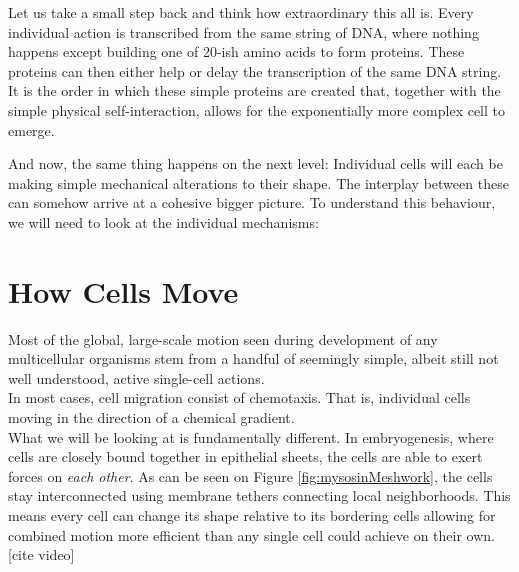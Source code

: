 Let us take a small step back and think how extraordinary this all is. Every individual action is transcribed from the same string of DNA, where nothing happens except building one of 20-ish amino acids to form proteins. These proteins can then either help or delay the transcription of the same DNA string. It is the order in which these simple proteins are created that, together with the simple physical self-interaction, allows for the exponentially more complex cell to emerge.


And now, the same thing happens on the next level: Individual cells will each be making simple mechanical alterations to their shape. The interplay between these can somehow arrive at a cohesive bigger picture. To understand this behaviour, we will need to look at the individual mechanisms:

\section{How Cells Move}
\label{sec:howmove}
Most of the global, large-scale motion seen during development of any multicellular organisms stem from a handful of seemingly simple, albeit still not well understood, active single-cell actions.\cite{walck2014cell}\\

In most cases, cell migration consist of chemotaxis. That is, individual cells moving in the direction of a chemical gradient.\\
What we will be looking at is fundamentally different. In embryogenesis, where cells are closely bound together in epithelial sheets, the cells are able to exert forces on \textit{each other}. As can be seen on Figure \ref{fig:mysosinMeshwork}, the cells stay interconnected using membrane tethers connecting local neighborhoods. This means every cell can change its shape relative to its bordering cells allowing for combined motion more efficient than any single cell could achieve on their own.[cite video] 


